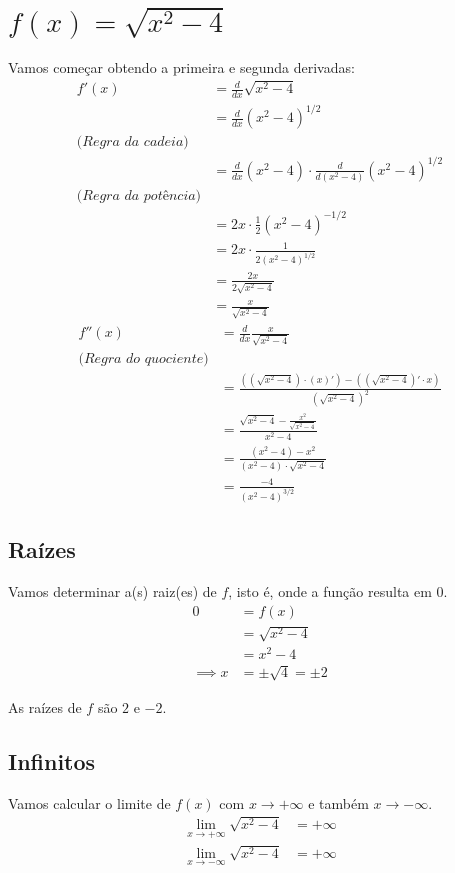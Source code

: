 \documentclass[12pt]{article}
\theoremstyle{definition}
\begin{document}
\section{\(f(x) = \sqrt{x^2-4}\)}
Vamos começar obtendo a primeira e segunda derivadas:
\begin{align*}
    f'(x)
    &= \frac{d}{dx} \sqrt{x^2-4} \\
    &= \frac{d}{dx} {(x^2-4)}^{1/2} \\
    \textit{(Regra da cadeia)} \\
    &= \frac{d}{dx} (x^2-4) \cdot \frac{d}{d(x^2-4)} {(x^2-4)}^{1/2}\\
    \textit{(Regra da potência)} \\
    &= 2x \cdot \frac{1}{2}{(x^2-4)}^{-1/2} \\
    &= 2x \cdot \frac{1}{2{(x^2-4)}^{1/2}} \\
    &= \frac{2x}{2\sqrt{x^2-4}} \\
    &= \frac{x}{\sqrt{x^2-4}}
\end{align*}
\begin{align*}
    f''(x)
    &= \frac{d}{dx} \frac{x}{\sqrt{x^2-4}} \\
    \textit{(Regra do quociente)} \\
    &= \frac{((\sqrt{x^2-4})\cdot (x)') - ((\sqrt{x^2-4})'\cdot x)}{{(\sqrt{x^2-4})}^2} \\
    &= \frac{\sqrt{x^2-4}-\frac{x^2}{\sqrt{x^2-4}}}{x^2-4} \\
    &= \frac{(x^2-4)-x^2}{(x^2-4) \cdot \sqrt{x^2-4}} \\
    &= \frac{-4}{{(x^2-4)}^{3/2}}
\end{align*}
\subsection{Raízes}
Vamos determinar a(s) raiz(es) de \(f\), isto é, onde a função resulta em 0.%
\begin{align*}
    0
    &= f(x) \\
    &= \sqrt{x^2-4} \\
    &= x^2-4 \\
    \implies x &= \pm \sqrt{4} = \pm 2
\end{align*}

As raízes de \(f\) são \(2\) e \(-2\).
\subsection{Infinitos}
Vamos calcular o limite de \(f(x)\) com \(x\rightarrow +\infty\) e também \(x\rightarrow -\infty\).
\begin{align*}
    \lim_{x\rightarrow+\infty} \sqrt{x^2-4} &= +\infty \\
    \lim_{x\rightarrow-\infty} \sqrt{x^2-4} &= +\infty
\end{align*}
\end{document}
